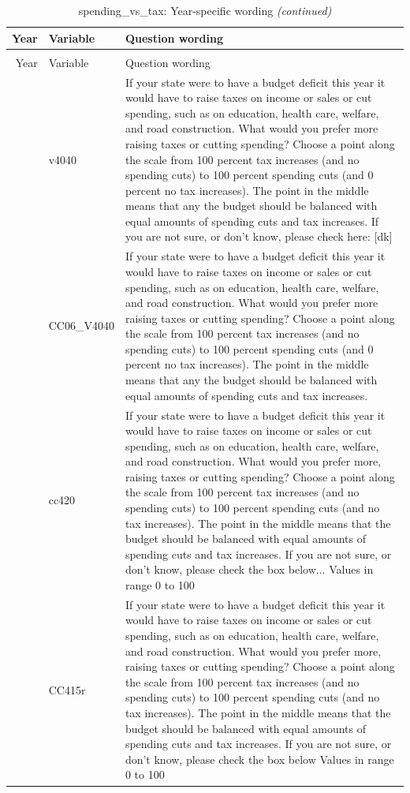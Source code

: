 \documentclass[
  12pt]{article}
\begin{document}
\begin{longtable}[t]{rl>{\raggedright\arraybackslash}p{10cm}}
\caption{\label{tab:unnamed-chunk-5}spending\_vs\_tax: Year-specific wording}\\
\toprule
Year & Variable & Question wording\\
\midrule
\endfirsthead
\caption[]{spending\_vs\_tax: Year-specific wording \textit{(continued)}}\\
\toprule
Year & Variable & Question wording\\
\midrule
\endhead

\endfoot
\bottomrule
\endlastfoot
2006 & v4040 & If your state were to have a budget deficit this year it would have to raise taxes on income or sales or cut spending, such as on education, health care, welfare, and road construction. What would you prefer more raising taxes or cutting spending? Choose a point along the scale from 100 percent tax increases (and no spending cuts) to 100 percent spending cuts (and 0 percent no tax increases). The point in the middle means that any the budget should be balanced with equal amounts of spending cuts and tax increases.  If you are not sure, or don't know, please check here: [dk]\\
\addlinespace
2007 & CC06\_V4040 & If your state were to have a budget deficit this year it would have to raise taxes on income or sales or cut spending, such as on education, health care, welfare, and road construction. What would you prefer more raising taxes or cutting spending? Choose a point along the scale from 100 percent tax increases (and no spending cuts) to 100 percent spending cuts (and 0 percent no tax increases). The point in the middle means that any the budget should be balanced with equal amounts of spending cuts and tax increases.\\
\addlinespace
2008 & cc420 & If your state were to have a budget deficit this year it would have to raise taxes on income or sales or cut spending, such as on education, health care, welfare, and road construction. What would you prefer more, raising taxes or cutting spending? Choose a point along the scale from 100 percent tax increases (and no spending cuts) to 100 percent spending cuts (and no tax increases). The point in the middle means that the budget should be balanced with equal amounts of spending cuts and tax increases.  If you are not sure, or don't know, please check the box below... Values in range 0 to 100\\
\addlinespace
2010 & CC415r & If your state were to have a budget deficit this year it would have to raise taxes on income or sales or cut spending, such as on education, health care, welfare, and road construction. What would you prefer more, raising taxes or cutting spending? Choose a point along the scale from 100 percent tax increases (and no spending cuts) to 100 percent spending cuts (and no tax increases). The point in the middle means that the budget should be balanced with equal amounts of spending cuts and tax increases. If you are not sure, or don't know, please check the box below Values in range 0 to 100\\

\end{longtable}
\end{document}
